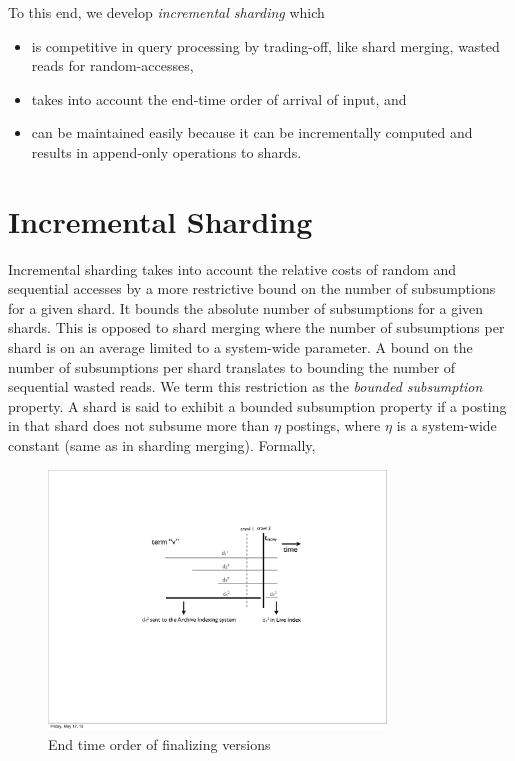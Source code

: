 To this end, we develop \emph{incremental sharding} which
\begin{itemize}
	\item is competitive in query processing by trading-off, like shard merging, wasted reads for random-accesses, 

	\item takes into account the end-time order of arrival of input, and	
	\item can be maintained easily because it can be incrementally computed and results in append-only operations to shards.
\end{itemize}

\section{Incremental Sharding}
\label{chap:sharding:sec:inc_sharding}

Incremental sharding takes into account the relative costs of random and sequential accesses by a more restrictive bound on the number of subsumptions for a given shard. It bounds the absolute number of subsumptions for a given shards. This is opposed to shard merging where the number of subsumptions per shard is on an average limited to a system-wide parameter. A bound on the number of subsumptions per shard translates to bounding the number of sequential wasted reads. We term this restriction as the \emph{bounded subsumption} property. A shard is said to exhibit a bounded subsumption property if a posting in that shard does not subsume more than $\eta$ postings, where $\eta$ is a system-wide constant (same as in sharding merging). Formally,

\begin{figure}[tb]
	\centering
		\includegraphics[width=0.8\textwidth]{resources/sliding_wind_grayscale.pdf}
	\caption{End time order of finalizing versions}
	 \label{fig:finalizing_versions}
\end{figure}

